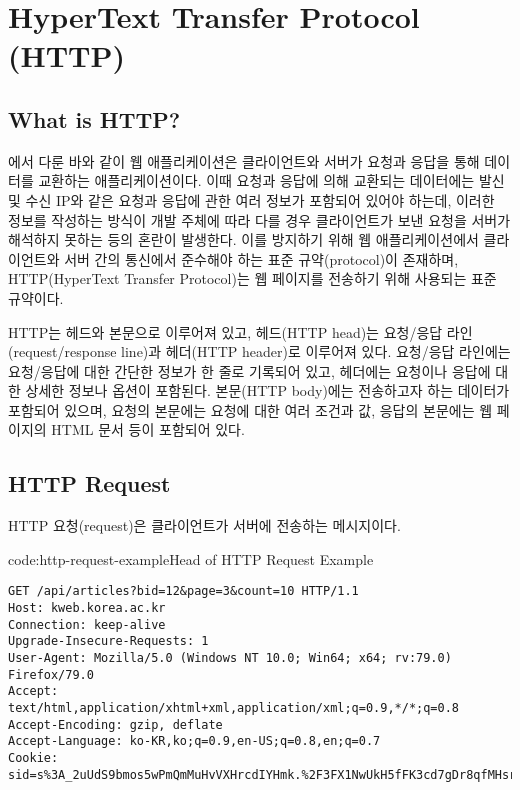 \section{HyperText Transfer Protocol (HTTP)}\label{sect:http}

\subsection*{What is HTTP?}

에서 다룬 바와 같이 웹 애플리케이션은 클라이언트와 서버가 요청과 응답을 통해 데이터를 교환하는 애플리케이션이다. 이때 요청과 응답에 의해 교환되는 데이터에는 발신 및 수신 IP와 같은 요청과 응답에 관한 여러 정보가 포함되어 있어야 하는데, 이러한 정보를 작성하는 방식이 개발 주체에 따라 다를 경우 클라이언트가 보낸 요청을 서버가 해석하지 못하는 등의 혼란이 발생한다. 이를 방지하기 위해 웹 애플리케이션에서 클라이언트와 서버 간의 통신에서 준수해야 하는 표준 규약(protocol)이 존재하며, HTTP(HyperText Transfer Protocol)는 웹 페이지를 전송하기 위해 사용되는 표준 규약이다.

HTTP는 헤드와 본문으로 이루어져 있고, 헤드(HTTP head)는 요청/응답 라인(request/response line)과 헤더(HTTP header)로 이루어져 있다. 요청/응답 라인에는 요청/응답에 대한 간단한 정보가 한 줄로 기록되어 있고, 헤더에는 요청이나 응답에 대한 상세한 정보나 옵션이 포함된다. 본문(HTTP body)에는 전송하고자 하는 데이터가 포함되어 있으며, 요청의 본문에는 요청에 대한 여러 조건과 값, 응답의 본문에는 웹 페이지의 HTML 문서 등이 포함되어 있다.

\subsection*{HTTP Request}

HTTP 요청(request)은 클라이언트가 서버에 전송하는 메시지이다.

\begin{codeenv}{code:http-request-example}{Head of HTTP Request Example}\begin{verbatim}
GET /api/articles?bid=12&page=3&count=10 HTTP/1.1
Host: kweb.korea.ac.kr
Connection: keep-alive
Upgrade-Insecure-Requests: 1
User-Agent: Mozilla/5.0 (Windows NT 10.0; Win64; x64; rv:79.0) Firefox/79.0
Accept: text/html,application/xhtml+xml,application/xml;q=0.9,*/*;q=0.8
Accept-Encoding: gzip, deflate
Accept-Language: ko-KR,ko;q=0.9,en-US;q=0.8,en;q=0.7
Cookie: sid=s%3A_2uUdS9bmos5wPmQmMuHvVXHrcdIYHmk.%2F3FX1NwUkH5fFK3cd7gDr8qfMHsrvfMWGSO
\end{verbatim}
\end{codeenv}

